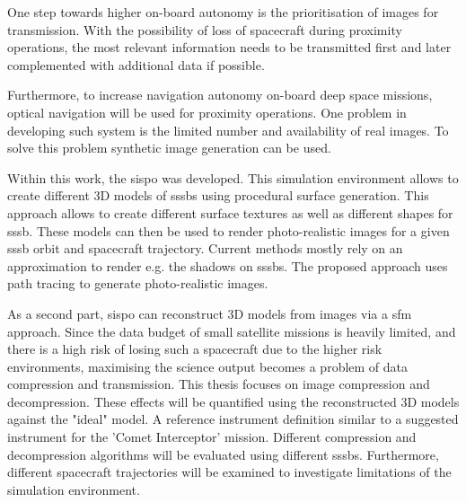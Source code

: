 One step towards higher on-board autonomy is the prioritisation of images for transmission. With the  possibility of loss of spacecraft during proximity operations, the most relevant information needs to be transmitted first and later complemented with additional data if possible.

Furthermore, to increase navigation autonomy on-board deep space missions, optical navigation will be used for proximity operations. One problem in developing such system is the limited number and availability of real images. To solve this problem synthetic image generation can be used.

Within this work, the \gls{sispo} was developed. This simulation environment allows to create different 3D models of \gls{sssb}s using procedural surface generation. This approach allows to create different surface textures as well as different shapes for \gls{sssb}. These models can then be used to render photo-realistic images for a given \gls{sssb} orbit and spacecraft trajectory. Current methods mostly rely on an approximation to render e.g. the shadows on \gls{sssb}s. The proposed approach uses path tracing to generate photo-realistic images.

As a second part, \gls{sispo} can reconstruct 3D models from images via a \gls{sfm} approach. Since the data budget of small satellite missions is heavily limited, and there is a high risk of losing such a spacecraft due to the higher risk environments, maximising the science output becomes a problem of data compression and transmission. 
This thesis focuses on image compression and decompression. These effects will be quantified using the reconstructed 3D models against the "ideal" model. A reference instrument definition similar to a suggested instrument for the 'Comet Interceptor' mission. Different compression and decompression algorithms will be evaluated using different \gls{sssb}s. Furthermore, different spacecraft trajectories will be examined to investigate limitations of the simulation environment.
